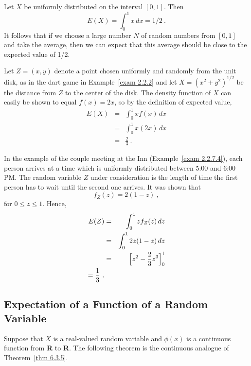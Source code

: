 {\begin{example}\label{exam 6.16} Let $X$ be uniformly distributed on the interval
$[0, 1]$.  Then 
$$E(X) = \int_0^1 x\,dx = 1/2\ .$$    It follows that if we choose a large number $N$
of random numbers from $[0,1]$ and take the average, then we can expect that this
average should be close to the expected value of 1/2.  
\end{example}

\begin{example}\label{exam 6.17} Let $Z = (x, y)$ denote a point chosen uniformly and
randomly from the unit disk, as in the dart game in Example~\ref{exam 2.2.2} and let
$X = (x^2 + y^2)^{1/2}$ be the distance from $Z$ to the center of the disk.  The
density function of $X$ can easily be shown to equal $f(x) = 2x$, so by the
definition of expected value,
\begin{eqnarray*} E(X) & = & \int_0^1 x f(x)\,dx \\ & = & \int_0^1 x (2x)\,dx \\ & =
& \frac 23\ .
\end{eqnarray*}
\end{example}

\begin{example}\label{exam 6.18}   In the example of the couple meeting at the Inn
(Example~\ref{exam 2.2.7.4}), each person arrives at a time which is uniformly
distributed between 5:00 and 6:00 PM.  The random variable $Z$ under consideration is
the length of time the first person has to wait until the second one arrives.  It was
shown that
$$f_Z(z) = 2(1-z)\ ,$$ for $0 \le z \le 1$. Hence,
\begin{eqnarray*} E(Z) & = & \int_0^1 zf_Z(z)\,dz \\
     & = & \int_0^1 2z(1-z)\,dz \\
     & = & \Bigl[z^2 - \frac 23 z^3\Bigl]_0^1 \\  = \frac 13\ .
\end{eqnarray*}
\end{example}

\subsection*{Expectation of a Function of a Random Variable}

Suppose that $X$ is a real-valued random variable  and $\phi(x)$ is a continuous
function from {\bf R} to {\bf R}.  The following theorem is the continuous analogue
of Theorem~\ref{thm 6.3.5}.

}
